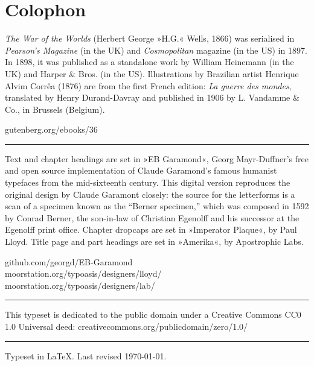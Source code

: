 \documentclass[
a5paper,
]{scrbook} %
\begin{document}
\chapter*{Colophon}
\centering
\vfill
\vfill
\begin{minipage}{\textwidth}
\textit{The War of the Worlds} (Herbert George »H.G.« Wells, 1866) was serialised in \textit{Pearson's Magazine} (in the UK) and \textit{Cosmopolitan} magazine (in the US) in 1897. In 1898, it was published as a standalone work by William Heinemann (in the UK) and Harper \& Bros. (in the US). Illustrations by Brazilian artist Henrique Alvim Corrêa (1876) are from the first French edition: \textit{La guerre des mondes}, translated by Henry Durand-Davray and published in 1906 by L. Vandamme \& Co., in Brussels (Belgium).
\end{minipage}
\vfill
gutenberg.org/ebooks/36
\vfill
\rule{0.5\textwidth}{.4pt}
\vfill
\begin{minipage}{\textwidth}
Text and chapter headings are set in »EB Garamond«, Georg Mayr-Duffner's free and open source implementation of Claude Garamond’s famous humanist typefaces from the mid-sixteenth century. This digital version reproduces the original design by Claude Garamont closely: the source for the letterforms is a scan of a specimen known as the \enquote{Berner specimen,} which was composed in 1592 by Conrad Berner, the son-in-law of Christian Egenolff and his successor at the Egenolff print office. Chapter dropcaps are set in »Imperator Plaque«, by Paul Lloyd. Title page and part headings are set in »Amerika«, by Apostrophic Labs.
\end{minipage}
\vfill
github.com/georgd/EB-Garamond\\
moorstation.org/typoasis/designers/lloyd/\\
moorstation.org/typoasis/designers/lab/
\vfill
\rule{0.5\textwidth}{.4pt}
\vfill
\begin{minipage}{\textwidth}
This typeset is dedicated to the public domain under a Creative Commons CC0 1.0 Universal deed: creativecommons.org/publicdomain/zero/1.0/
\end{minipage}
\vfill
\rule{0.5\textwidth}{.4pt}
\vfill
Typeset in \LaTeX{}. Last revised \today.

\thispagestyle{empty}
\end{document}
